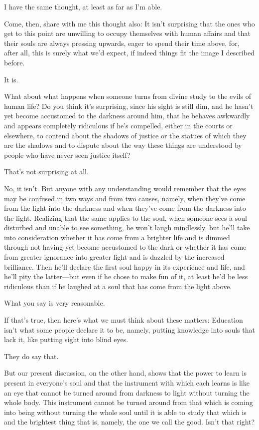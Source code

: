 			I have the same thought, at least as far as I'm able. 

			Come, then, share with me this thought also: It isn't surprising that the ones who get to this point are unwilling to occupy themselves with human affairs and that their souls are always pressing upwards, eager to spend their time above, for, after all, this is surely what we'd expect, if indeed things fit the image I described before. 

			It is. 

			What about what happens when someone turns from divine study to the evils of human life? Do you think it's surprising, since his sight is still dim, and he hasn't yet become accustomed to the darkness around him, that he behaves awkwardly and appears completely ridiculous if he's compelled, either in the courts or elsewhere, to contend about the shadows of justice or the statues of which they are the shadows and to dispute about the way these things are understood by people who have never seen justice itself? 

			That's not surprising at all. 

			No, it isn't. But anyone with any understanding would remember that the eyes may be confused in two ways and from two causes, namely, when they've come from the light into the darkness and when they've come from the darkness into the light. Realizing that the same applies to the soul, when someone sees a soul disturbed and unable to see something, he won't laugh mindlessly, but he'll take into consideration whether it has come from a brighter life and is dimmed through not having yet become accustomed to the dark or whether it has come from greater ignorance into greater light and is dazzled by the increased brilliance. Then he'll declare the first soul happy in its experience and life, and he'll pity the latter---but even if he chose to make fun of it, at least he'd be less ridiculous than if he laughed at a soul that has come from the light above. 

			What you say is very reasonable. 

			If that's true, then here's what we must think about these matters: Education isn't what some people declare it to be, namely, putting knowledge into souls that lack it, like putting sight into blind eyes. 

			They do say that. 

			But our present discussion, on the other hand, shows that the power to learn is present in everyone's soul and that the instrument with which each learns is like an eye that cannot be turned around from darkness to light without turning the whole body. This instrument cannot be turned around from that which is coming into being without turning the whole soul until it is able to study that which is and the brightest thing that is, namely, the one we call the good. Isn't that right? 

